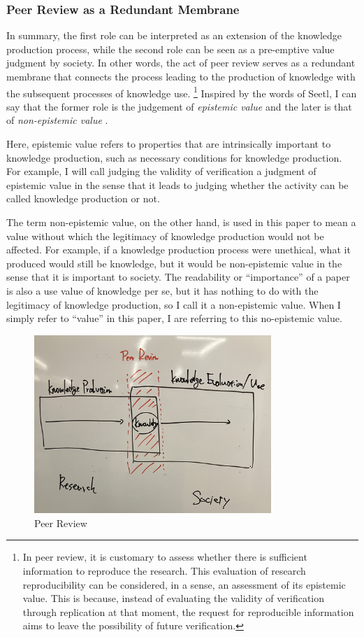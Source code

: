 \documentclass{article}
\begin{document}
\subsubsection{Peer Review as a Redundant Membrane}

In summary, the first role can be interpreted as an extension of the knowledge production process, while the second role can be seen as a pre-emptive value judgment by society. In other words, the act of peer review serves as a redundant membrane that connects the process leading to the production of knowledge with the subsequent processes of knowledge use. \footnote{
In peer review, it is customary to assess whether there is sufficient information to reproduce the research. This evaluation of research reproducibility can be considered, in a sense, an assessment of its epistemic value. This is because, instead of evaluating the validity of verification through replication at that moment, the request for reproducible information aims to leave the possibility of future verification.
} Inspired by the words of Seetl, I can say that the former role is the judgement of \textit{epistemic value} and the later is that of \textit{non-epistemic value} \cite{steel2010epistemic}. 

Here, epistemic value refers to properties that are intrinsically important to knowledge production, such as necessary conditions for knowledge production. For example, I will call judging the validity of verification a judgment of epistemic value in the sense that it leads to judging whether the activity can be called knowledge production or not. 

The term non-epistemic value, on the other hand, is used in this paper to mean a value without which the legitimacy of knowledge production would not be affected. For example, if a knowledge production process were unethical, what it produced would still be knowledge, but it would be non-epistemic value in the sense that it is important to society. The readability or ``importance'' of a paper is also a use value of knowledge per se, but it has nothing to do with the legitimacy of knowledge production, so I call it a non-epistemic value. When I simply refer to ``value'' in this paper, I are referring to this no-epistemic value.

\begin{figure}[htb]
    \centering
    \includegraphics[width=0.8\textwidth]{figs/peer_review.jpg}
    \caption{Peer Review}
    \label{fig:peer_review}
\end{figure}
\end{document}
